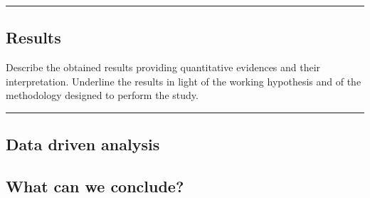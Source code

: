 {\color{gray}\hrule}
\begin{center}
\section{Results}
Describe the obtained results providing quantitative evidences and their interpretation.
Underline the results in light of the working hypothesis and of the methodology designed to perform the study.
\bigskip
\end{center}
{\color{gray}\hrule}
\begin{multicols}{2}
\subsection{Data driven analysis}

\subsection{What can we conclude?}

\end{multicols}